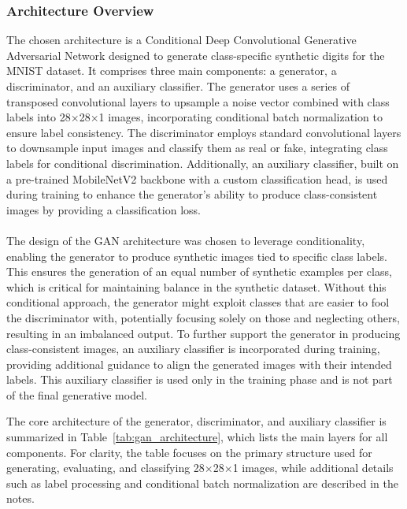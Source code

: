 \documentclass[12pt]{article}
\begin{document}
\subsubsection{Architecture Overview}
\label{subsubsec:architecture_overview}
The chosen architecture is a Conditional Deep Convolutional Generative Adversarial Network designed to generate class-specific synthetic digits for the MNIST dataset. It comprises three main components: a generator, a discriminator, and an auxiliary classifier. The generator uses a series of transposed convolutional layers to upsample a noise vector combined with class labels into 28$\times$28$\times$1 images, incorporating conditional batch normalization to ensure label consistency. The discriminator employs standard convolutional layers to downsample input images and classify them as real or fake, integrating class labels for conditional discrimination. Additionally, an auxiliary classifier, built on a pre-trained MobileNetV2 backbone with a custom classification head, is used during training to enhance the generator’s ability to produce class-consistent images by providing a classification loss.
\\
\\
The design of the GAN architecture was chosen to leverage conditionality, enabling the generator to produce synthetic images tied to specific class labels. This ensures the generation of an equal number of synthetic examples per class, which is critical for maintaining balance in the synthetic dataset. Without this conditional approach, the generator might exploit classes that are easier to fool the discriminator with, potentially focusing solely on those and neglecting others, resulting in an imbalanced output. To further support the generator in producing class-consistent images, an auxiliary classifier is incorporated during training, providing additional guidance to align the generated images with their intended labels. This auxiliary classifier is used only in the training phase and is not part of the final generative model.

The core architecture of the generator, discriminator, and auxiliary classifier is summarized in Table~\ref{tab:gan_architecture}, which lists the main layers for all components. For clarity, the table focuses on the primary structure used for generating, evaluating, and classifying 28$\times$28$\times$1 images, while additional details such as label processing and conditional batch normalization are described in the notes.
\end{document}
